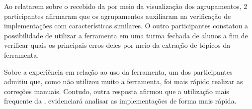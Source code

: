 		Ao relatarem sobre o  recebido da 
		por meio da visualização dos agrupamentos, 2 participantes afirmaram que
		os agrupamentos auxiliaram na verificação de implementações com características
		similares. O outro participantes constatou a possibilidade de utilizar a
		ferramenta em uma turma fechada de alunos a fim de verificar quais os principais
		erros deles por meio da extração de tópicos da ferramenta.
		
		Sobre a experiência em relação ao uso da ferramenta, um dos participantes
		admitiu que, como não utilizou muito a ferramenta, foi mais rápido realizar
		as correções manuais. Contudo, outra resposta afirmou que a utilização mais
		frequente da , evidenciará analisar as implementações
		de forma mais rápida.
		

